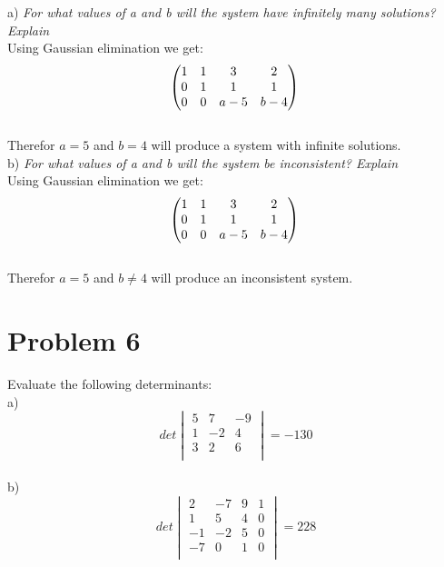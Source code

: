 \documentclass[]{article}
\begin{document}
a) \emph{For what values of a and b will the system have infinitely many solutions? Explain} \\
Using Gaussian elimination we get:
$$
\begin{pmatrix}
1 & 1 & 3 & 2 \\
0 & 1 & 1 & 1 \\
0 & 0 & a-5 & b-4 \\
\end{pmatrix} \\
$$ \\
Therefor $a=5$ and $b=4$ will produce a system with infinite solutions.\\

b) \emph{For what values of a and b will the system be inconsistent? Explain} \\
Using Gaussian elimination we get:
$$
\begin{pmatrix}
	1 & 1 & 3 & 2 \\
	0 & 1 & 1 & 1 \\
	0 & 0 & a-5 & b-4 \\
\end{pmatrix} \\
$$ \\
Therefor $a=5$ and $b\neq4$ will produce an inconsistent system.\\

\newpage
\section{Problem 6}
Evaluate the following determinants: \\
a) 
$$ det
\begin{vmatrix}
	5 & 7 &-9 \\
	1 &-2 & 4 \\
	3 & 2 & 6 \\
\end{vmatrix}
= -130
$$ \\
b) 
$$ det
\begin{vmatrix}
	2 &-7 & 9 & 1 \\
	1 & 5 & 4 & 0 \\
	-1&-2 & 5 & 0 \\
	-7& 0 & 1 & 0 \\
\end{vmatrix}
= 228
$$ \\
\end{document}
